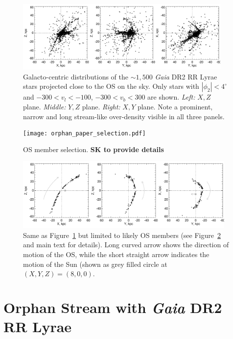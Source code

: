 \documentclass[a4paper,useAMS,usenatbib]{mnras}
\newcommand{\gaia}{\textit{Gaia} }
\begin{document}
%
\begin{figure}
  \centering
  \includegraphics[width=0.95\textwidth]{orphan_paper_xyz.pdf}
  \caption[]{Galacto-centric distributions of the $\sim1,500$ \gaia
    DR2 RR Lyrae stars projected close to the OS on the sky. Only
    stars with $|\phi_2|<4^{\circ}$ and $-300<v_l <-100$, $-300<v_b
    <300$ are shown. {\it Left:} $X,Z$ plane. {\it Middle:} $Y,Z$
    plane. {\it Right:} $X,Y$ plane. Note a prominent, narrow and long
    stream-like over-density visible in all three panels.}
   \label{fig:xyzgdr2}
\end{figure}
%


%
\begin{figure}
  \centering
  \texttt{[image: orphan\_paper\_selection.pdf]}
  \caption[]{OS member selection. {\bf SK to provide details}}
   \label{fig:selection}
\end{figure}
%


%
\begin{figure}
  \centering
  \includegraphics[width=0.97\textwidth]{orphan_paper_xyz_members.pdf}
  \caption[]{Same as Figure~\ref{fig:xyzgdr2} but limited to likely OS
    members (see Figure~\ref{fig:selection} and main text for
    details). Long curved arrow shows the direction of motion of the
    OS, while the short straight arrow indicates the motion of the Sun
    (shown as grey filled circle at $(X,Y,Z)=(8,0,0)$.}
   \label{fig:xyzmem}
\end{figure}
%

\section{Orphan Stream with \gaia DR2 RR Lyrae}
\end{document}
